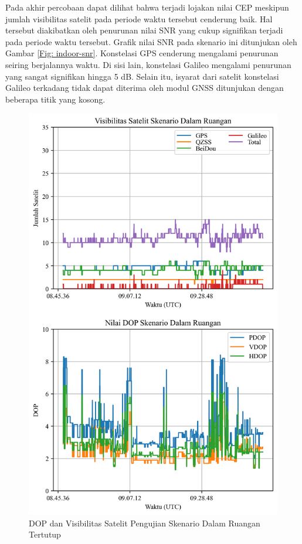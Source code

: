 Pada akhir percobaan dapat dilihat bahwa terjadi lojakan nilai CEP meskipun jumlah visibilitas satelit pada periode waktu tersebut cenderung baik. Hal tersebut diakibatkan oleh penurunan nilai SNR yang cukup signifikan terjadi pada periode waktu tersebut. Grafik nilai SNR pada skenario ini ditunjukan oleh Gambar \ref{Fig: indoor-snr}. Konstelasi GPS cenderung mengalami penurunan seiring berjalannya waktu. Di sisi lain, konstelasi Galileo mengalami penurunan yang sangat signifikan hingga 5 dB. Selain itu, isyarat dari satelit konstelasi Galileo terkadang tidak dapat diterima oleh modul GNSS ditunjukan dengan beberapa titik yang kosong.

\begin{figure}[H]
	\centering
	\captionsetup{justification=centering}
	\includegraphics[width=12cm]{contents/chapter-4/2-skenario-indoor/sats_dop.png}
	\caption{DOP dan Visibilitas Satelit Pengujian Skenario Dalam Ruangan Tertutup}
	\label{Fig: indoor-sats_dop}
\end{figure}


